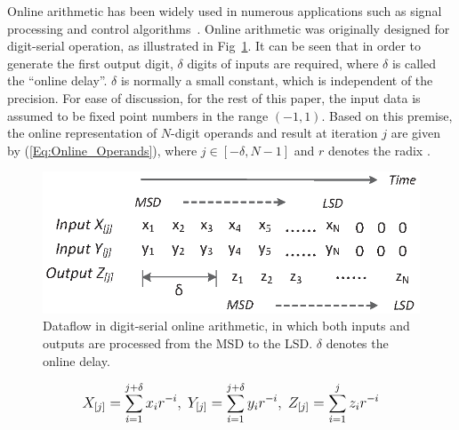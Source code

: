 \documentclass[conference]{IEEEtran}
\begin{document}
Online arithmetic has been widely used in numerous applications such as signal processing and control algorithms~\cite{Online_FPGADSP,Online_Control}. Online arithmetic was originally designed for digit-serial operation, as illustrated in Fig~\ref{Fig:OnlineDataFlow}. It can be seen that in order to generate the first output digit, $\delta$ digits of inputs are required, where $\delta$ is called the ``online delay''. $\delta$ is normally a small constant, which is independent of the precision. For ease of discussion, for the rest of this paper, the input data is assumed to be fixed point numbers in the range $(-1,1)$. Based on this premise, the online representation of $N$-digit operands and result at iteration $j$ are given by (\ref{Eq:Online_Operands}), where $j\in[-\delta,N-1]$ and $r$ denotes the radix \cite{Ercegovac_Book}.\vspace{-0.5ex}
%
\begin{figure}[tbp]
  \centering
  \includegraphics[width=.45\textwidth]{./Figures/OnlineArithmetic_DataFlow.eps}
  \vspace{-1ex}
  \caption{Dataflow in digit-serial online arithmetic, in which both inputs and outputs are processed from the MSD to the LSD. $\delta$ denotes the online delay.}
  \vspace{-2ex}
  \label{Fig:OnlineDataFlow}
\end{figure}
%
\begin{eqnarray}\label{Eq:Online_Operands}
\footnotesize
  X_{[j]}=\sum_{i=1}^{j+\delta}x_ir^{-i},~Y_{[j]}=\sum_{i=1}^{j+\delta}y_ir^{-i},~Z_{[j]}=\sum_{i=1}^{j}z_ir^{-i}
\normalsize
\end{eqnarray}
\end{document}
